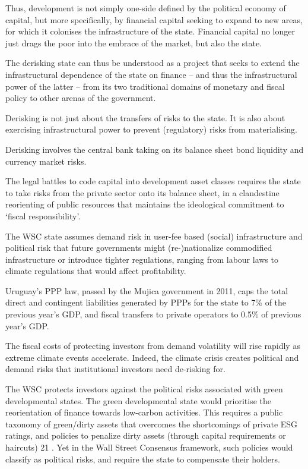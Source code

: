 \documentclass[
]{book}
\begin{document}
Thus, development is not simply one-side defined by the political economy of capital,
but more specifically, by financial capital seeking to expand to new
areas, for which it colonises the infrastructure of the state. Financial capital no longer
just drags the poor into the embrace of the market, but also the state.

The derisking state can thus be understood as a project that seeks to extend the
infrastructural dependence of the state on finance -- and thus the infrastructural power
of the latter -- from its two traditional domains of monetary and fiscal policy to other
arenas of the government.

Derisking is not just about the transfers of risks to the state.
It is also about exercising infrastructural power to prevent
(regulatory) risks from materialising.

Derisking involves the central bank taking on its balance sheet bond liquidity and
currency market risks.

The legal battles to code capital into development asset
classes requires the state to take risks from the private sector onto its balance sheet, in
a clandestine reorienting of public resources that maintains the ideological commitment
to `fiscal responsibility'.

The WSC state assumes demand risk in user-fee based (social) infrastructure and
political risk that future governments might (re-)nationalize commodified
infrastructure or introduce tighter regulations, ranging from labour laws to climate
regulations that would affect profitability.

Uruguay's PPP law, passed by the
Mujica government in 2011, caps the total direct and contingent liabilities generated by
PPPs for the state to 7\% of the previous year's GDP, and fiscal transfers to private
operators to 0.5\% of previous year's GDP.

The fiscal costs of protecting investors from demand volatility will rise rapidly as
extreme climate events accelerate. Indeed, the climate crisis creates political and
demand risks that institutional investors need de-risking for.

The WSC protects investors against the political risks associated with green
developmental states. The green developmental state would prioritise the reorientation
of finance towards low-carbon activities. This requires a public taxonomy of green/dirty
assets that overcomes the shortcomings of private ESG ratings, and policies to penalize
dirty assets (through capital requirements or haircuts) 21 . Yet in the Wall Street
Consensus framework, such policies would classify as political risks, and require the
state to compensate their holders.
\end{document}
